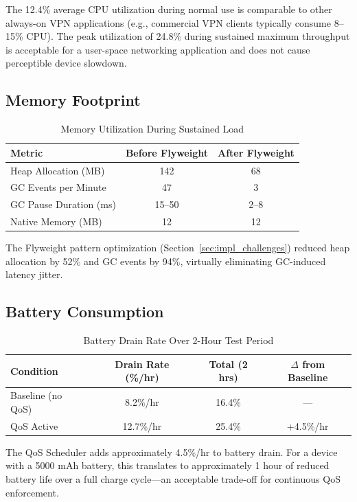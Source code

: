 The 12.4\% average CPU utilization during normal use is comparable to other always-on VPN applications (e.g., commercial VPN clients typically consume 8--15\% CPU). The peak utilization of 24.8\% during sustained maximum throughput is acceptable for a user-space networking application and does not cause perceptible device slowdown.

\subsection{Memory Footprint}

\begin{table}[H]
\centering
\caption{Memory Utilization During Sustained Load}
\label{tab:memory_results}
\begin{tabular}{lcc}
\toprule
\textbf{Metric} & \textbf{Before Flyweight} & \textbf{After Flyweight} \\
\midrule
Heap Allocation (MB)     & 142 & 68 \\
GC Events per Minute     & 47  & 3 \\
GC Pause Duration (ms)   & 15--50 & 2--8 \\
Native Memory (MB)       & 12 & 12 \\
\bottomrule
\end{tabular}
\end{table}

The Flyweight pattern optimization (Section~\ref{sec:impl_challenges}) reduced heap allocation by 52\% and GC events by 94\%, virtually eliminating GC-induced latency jitter.

\subsection{Battery Consumption}

\begin{table}[H]
\centering
\caption{Battery Drain Rate Over 2-Hour Test Period}
\label{tab:battery_results}
\begin{tabular}{lccc}
\toprule
\textbf{Condition} & \textbf{Drain Rate (\%/hr)} & \textbf{Total (2 hrs)} & \textbf{$\Delta$ from Baseline} \\
\midrule
Baseline (no QoS)   & 8.2\%/hr  & 16.4\% & --- \\
QoS Active           & 12.7\%/hr & 25.4\% & +4.5\%/hr \\
\bottomrule
\end{tabular}
\end{table}

The QoS Scheduler adds approximately 4.5\%/hr to battery drain. For a device with a 5000 mAh battery, this translates to approximately 1 hour of reduced battery life over a full charge cycle---an acceptable trade-off for continuous QoS enforcement.

